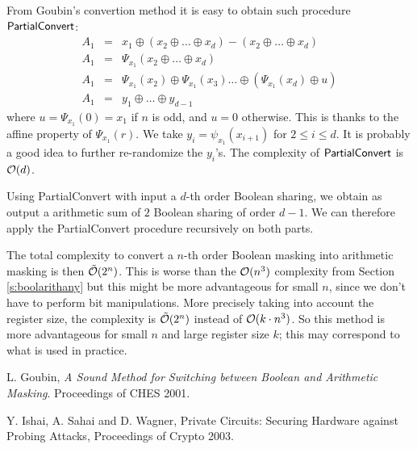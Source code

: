\documentclass[11pt]{llncs}
\begin{document}
From Goubin's convertion method it is easy to obtain such procedure
${\sf PartialConvert}$:
\begin{eqnarray*}
A_1 & = & x_1 \oplus (x_2 \oplus \ldots \oplus x_d) - (x_2 \oplus \ldots
\oplus x_d) \\
A_1 & = & \Psi_{x_1}(x_2 \oplus \ldots \oplus x_d) \\
A_1 & = & \Psi_{x_1}(x_2) \oplus \Psi_{x_1}(x_3) \ldots \oplus
(\Psi_{x_1}(x_d) \oplus u) \\
A_1 & = & y_1 \oplus \ldots \oplus y_{d-1}
\end{eqnarray*}
where $u=\Psi_{x_1}(0)=x_1$ if $n$ is odd, and $u=0$ otherwise. This
is thanks to the affine property of $\Psi_{x_1}(r)$. We take
$y_i=\psi_{x_1}(x_{i+1})$ for $2 \leq i \leq d$. It is probably a good
idea to further re-randomize the $y_i$'s. The complexity of ${\sf
  PartialConvert}$ is ${\cal O}(d)$.

Using {\sf PartialConvert} with input a $d$-th order Boolean
sharing, we obtain as output a arithmetic sum of $2$ Boolean sharing
of order $d-1$. We can therefore apply the {\sf PartialConvert}
procedure recursively on both parts.

The total complexity to convert a $n$-th order Boolean masking into
arithmetic masking is then
$\tilde{ \cal O}(2^n)$. This is worse than the ${\cal O}(n^3)$
complexity from
Section \ref{s:boolarithany} but this might be more advantageous for
small $n$, since we don't have to perform bit manipulations. More precisely
taking into account the register size, the complexity is $\tilde{ \cal
  O}(2^n)$ instead of ${\cal O}(k \cdot n^3)$. So this method is more
advantageous for small $n$ and large register size $k$; this may
correspond to what is used in practice.


\begin{thebibliography}{30}
L. Goubin, {\sl A Sound Method for Switching between Boolean and
  Arithmetic Masking}. Proceedings of CHES 2001.

Y. Ishai, A. Sahai and D. Wagner, 
{Private Circuits: Securing Hardware against Probing Attacks},
Proceedings of Crypto 2003.

\end{thebibliography}
\end{document}
